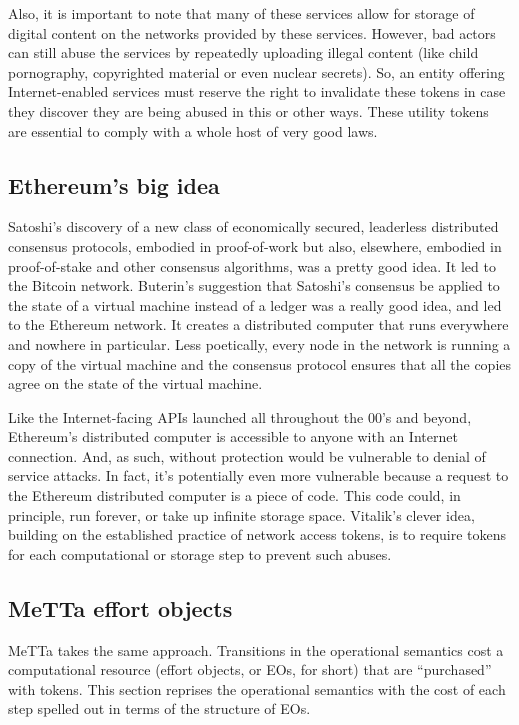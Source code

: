 Also, it is important to note that many of these services allow for storage of digital content on the networks provided by these services. However, bad actors can still abuse the services by repeatedly uploading illegal content (like child pornography, copyrighted material or even nuclear secrets). So, an entity offering Internet-enabled services must reserve the right to invalidate these tokens in case they discover they are being abused in this or other ways. These utility tokens are essential to comply with a whole host of very good laws.

\subsection{Ethereum’s big idea}
Satoshi’s discovery of a new class of economically secured, leaderless distributed consensus protocols, embodied in proof-of-work but also, elsewhere, embodied in proof-of-stake and other consensus algorithms, was a pretty good idea. It led to the Bitcoin network. Buterin’s suggestion that Satoshi’s consensus be applied to the state of a virtual machine instead of a ledger was a really good idea, and led to the Ethereum network. It creates a distributed computer that runs everywhere and nowhere in particular. Less poetically, every node in the network is running a copy of the virtual machine and the consensus protocol ensures that all the copies agree on the state of the virtual machine.

Like the Internet-facing APIs launched all throughout the 00’s and beyond, Ethereum’s distributed computer is accessible to anyone with an Internet connection. And, as such, without protection would be vulnerable to denial of service  attacks. In fact, it’s potentially even more vulnerable because a request to the Ethereum distributed computer is a piece of code. This code could, in principle, run forever, or take up infinite storage space. Vitalik’s clever idea, building on the established practice of network access tokens, is to require tokens for each computational or storage step to prevent such abuses.

\subsection{MeTTa effort objects}
MeTTa takes the same approach. Transitions in the operational semantics cost a computational resource (effort objects, or EOs, for short) that are ``purchased'' with tokens. This section reprises the operational semantics with the cost of each step spelled out in terms of the structure of EOs.

